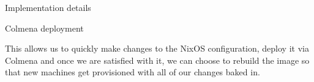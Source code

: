 \begin{frame}[fragile]{Implementation details}
\begin{block}{Colmena deployment}
\begin{Shaded}
\begin{Highlighting}[]
\OperatorTok{\{}
   \OperatorTok{=} \OperatorTok{\{}
     \OperatorTok{=} \OperatorTok{;}
  \OperatorTok{\};}

   \OperatorTok{=}\OperatorTok{\{} \OperatorTok{,} \OperatorTok{,}  \OperatorTok{\}}\NormalTok{:}
       \OperatorTok{=} \OperatorTok{(}  \OperatorTok{\{} \OperatorTok{;}  \OperatorTok{=} \OperatorTok{;} \OperatorTok{\});}

       \OperatorTok{=} \OperatorTok{\{}
         \OperatorTok{=} \OperatorTok{;}
      \OperatorTok{\};}

       \OperatorTok{=}   \OperatorTok{\{}
        \OperatorTok{;}
         \OperatorTok{=} \OperatorTok{[}\OperatorTok{];}
      \OperatorTok{\};}
    \OperatorTok{\{}
       \OperatorTok{=} \OperatorTok{\{}
         \OperatorTok{=} \OperatorTok{\{}
           \OperatorTok{=}\OperatorTok{;}
        \OperatorTok{\};}
         \OperatorTok{=}\OperatorTok{;}
      \OperatorTok{\}} \OperatorTok{//} \OperatorTok{(}\OperatorTok{);}
    \OperatorTok{\};}
\OperatorTok{\}}
\end{Highlighting}
\end{Shaded}

This allows us to quickly make changes to the NixOS configuration,
deploy it via Colmena and once we are satisfied with it, we can choose
to rebuild the image so that new machines get provisioned with all of
our changes baked in.
\end{block}


\end{frame}

